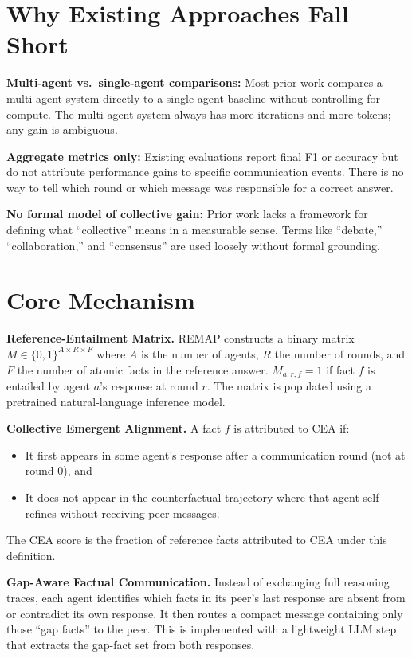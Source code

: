 \documentclass[10pt,twocolumn]{article}
\begin{document}
\section{Why Existing Approaches Fall Short}

\textbf{Multi-agent vs.\ single-agent comparisons:} Most prior work
compares a multi-agent system directly to a single-agent baseline
without controlling for compute. The multi-agent system always
has more iterations and more tokens; any gain is ambiguous.

\textbf{Aggregate metrics only:} Existing evaluations report final
F1 or accuracy but do not attribute performance gains to specific
communication events. There is no way to tell which round or which
message was responsible for a correct answer.

\textbf{No formal model of collective gain:} Prior work lacks a
framework for defining what ``collective'' means in a measurable
sense. Terms like ``debate,'' ``collaboration,'' and ``consensus''
are used loosely without formal grounding.

\section{Core Mechanism}

\textbf{Reference-Entailment Matrix.} REMAP constructs a binary
matrix $M \in \{0, 1\}^{A \times R \times F}$ where $A$ is the
number of agents, $R$ the number of rounds, and $F$ the number of
atomic facts in the reference answer. $M_{a, r, f} = 1$ if fact $f$
is entailed by agent $a$'s response at round $r$. The matrix is
populated using a pretrained natural-language inference model.

\textbf{Collective Emergent Alignment.} A fact $f$ is attributed to
CEA if:
\begin{itemize}[itemsep=1pt,parsep=0pt]
  \item It first appears in some agent's response after a communication
    round (not at round 0), and
  \item It does not appear in the counterfactual trajectory where
    that agent self-refines without receiving peer messages.
\end{itemize}
The CEA score is the fraction of reference facts attributed to CEA
under this definition.

\textbf{Gap-Aware Factual Communication.} Instead of exchanging full
reasoning traces, each agent identifies which facts in its peer's
last response are absent from or contradict its own response.
It then routes a compact message containing only those ``gap facts''
to the peer. This is implemented with a lightweight LLM step that
extracts the gap-fact set from both responses.
\end{document}
